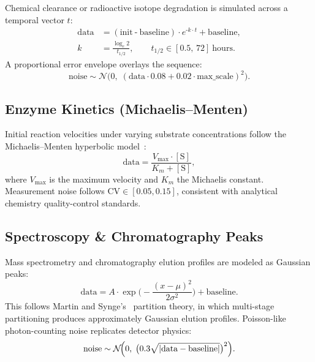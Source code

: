 \documentclass[11pt,twocolumn]{article}
\newcommand{\N}{\mathcal{N}}
\begin{document}
Chemical clearance or radioactive isotope degradation is simulated across a temporal vector $t$:
\begin{align}
  \text{data} &= (\text{init} \mathbin{\text{-}} \text{baseline}) \cdot e^{\text{-}k \cdot t} + \text{baseline}, \label{eq:decay}\\
  k &= \frac{\log_e 2}{t_{1/2}}, \qquad t_{1/2} \in [0.5,\, 72]~\text{hours}. \label{eq:halflife}
\end{align}
A proportional error envelope overlays the sequence:
\begin{equation}\label{eq:decay_noise}
  \text{noise} \sim \N\bigl(0,\; (\text{data} \cdot 0.08 + 0.02 \cdot \text{max\_scale})^2\bigr).
\end{equation}

\subsection{Enzyme Kinetics (Michaelis--Menten)}\label{sec:mm}

Initial reaction velocities under varying substrate concentrations follow the Michaelis--Menten hyperbolic model~\cite{michaelis1913kinetik}:
\begin{equation}\label{eq:mm}
  \text{data} = \frac{V_{\max} \cdot [\text{S}]}{K_m + [\text{S}]},
\end{equation}
where $V_{\max}$ is the maximum velocity and $K_m$ the Michaelis constant. Measurement noise follows $\text{CV} \in [0.05, 0.15]$, consistent with analytical chemistry quality-control standards.

\subsection{Spectroscopy \& Chromatography Peaks}\label{sec:peaks}

Mass spectrometry and chromatography elution profiles are modeled as Gaussian peaks:
\begin{equation}\label{eq:gauss_peak}
  \text{data} = A \cdot \exp\!\biggl(-\frac{(x-\mu)^2}{2\sigma^2}\biggr) + \text{baseline}.
\end{equation}
This follows Martin and Synge's~\cite{martin1941new} partition theory, in which multi-stage partitioning produces approximately Gaussian elution profiles. Poisson-like photon-counting noise replicates detector physics:
\begin{equation}\label{eq:poisson_noise}
  \text{noise} \sim \N\!\Bigl(0,\;\bigl(0.3\sqrt{|\text{data}-\text{baseline}|}\bigr)^2\Bigr).
\end{equation}
\end{document}
